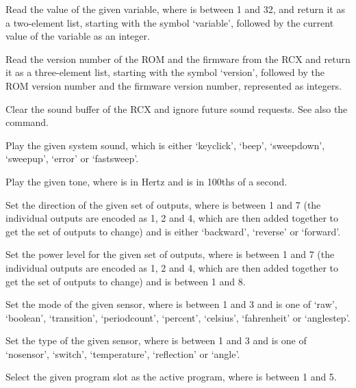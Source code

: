   Read the value of the given variable, where  is between 1 and 32, and return it as a two-element list,
  starting with the symbol `variable', followed by the current value of the variable as an integer.
  
  Read the version number of the ROM and the firmware from the RCX and return it as a three-element list, starting
  with the symbol `version', followed by the ROM version number and the firmware version number, represented as integers.
  
  Clear the sound buffer of the RCX and ignore future sound requests.
  See also the  command.
  
  Play the given system sound, which is either `keyclick', `beep', `sweepdown', `sweepup', `error' or `fastsweep'.
  
  Play the given tone, where  is in Hertz and  is in 100ths of a second.
  
  Set the direction of the given set of outputs, where  is between 1 and 7
  (the individual outputs are encoded as 1, 2 and 4, which are then added together to get the set of outputs to change) and
   is either `backward', `reverse' or `forward'.
  
  Set the power level for the given set of outputs, where  is between 1 and 7
  (the individual outputs are encoded as 1, 2 and 4, which are then added together to get the set of outputs to change) and
   is between 1 and 8.
  
  Set the mode of the given sensor, where  is between 1 and 3 and  is one of `raw', `boolean',
  `transition', `periodcount', `percent', `celsius', `fahrenheit' or `anglestep'.
  
  Set the type of the given sensor, where  is between 1 and 3 and  is one of `nosensor',
  `switch', `temperature', `reflection' or `angle'.
  
  Select the given program slot as the active program, where  is between 1 and 5.
  
